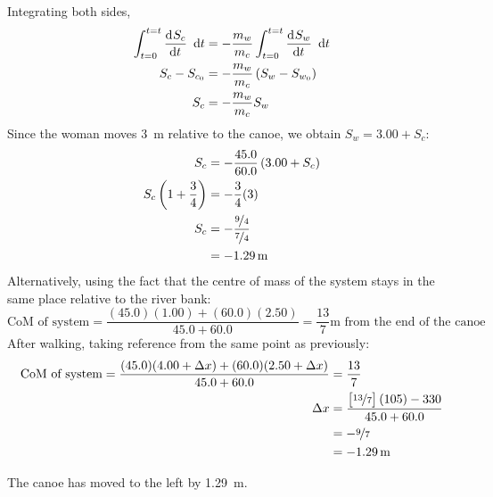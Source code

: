 \documentclass[11pt]{exam}
\begin{document}
\begin{questions}
{\begin{solution}
				Integrating both sides, 
				\begin{align*}
					\int_{t = 0}^{t = t} \dod{S_c}{t} ~\dif t &= -\frac{m_w}{m_c} \int_{t = 0}^{t = t} \dod{S_w}{t} ~\dif t \\
					S_c - S_{c_0} &= -\frac{m_w}{m_c}\left(S_w - S_{w_0}\right) \\
					S_c &= -\frac{m_w}{m_c}S_w 
				\end{align*}
				Since the woman moves \SI{3}{\meter} relative to the canoe, we obtain $S_w = 3.00 + S_c$:
				\begin{align*}
					S_c &= -\frac{45.0}{60.0} \left(3.00 + S_c\right) \\
					S_c \left(1 + \frac{3}{4}\right) &= -\frac{3}{4}(3) \\
					S_c &= -\frac{\nicefrac{9}{4}}{\nicefrac{7}{4}} \\
					&= -\SI{1.29}{\metre}
				\end{align*}
				Alternatively, using the fact that the centre of mass of the system stays in the same place relative to the river bank:
				\begin{equation*}
					\text{CoM of system} = \frac{(45.0)(1.00) + (60.0)(2.50)}{45.0 + 60.0} = \frac{13}{7} \text{m from the end of the canoe}
				\end{equation*}
				After walking, taking reference from the same point as previously:
				\begin{align*}
					\text{CoM of system} = \frac{(45.0)(4.00 + \Delta x) + (60.0)(2.50 + \Delta x)}{45.0 + 60.0} &= \frac{13}{7} \\
					\Delta x &= \frac{\left[\nicefrac{13}{7}\right]\left(105\right) - 330}{45.0 + 60.0} \\
					&= -\nicefrac{9}{7} \\
					&= -\SI{1.29}{m} \\
				\end{align*}
				\vspace{-1.5cm}
				
				The canoe has moved to the left by \SI{1.29}{\meter}.
			\end{solution}
		}
		\ifprintanswers
			\pagebreak
		\fi
	
\end{questions}
\end{document}
